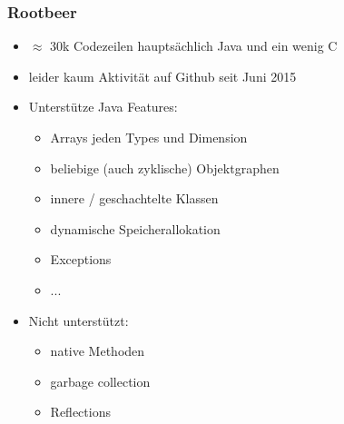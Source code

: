 \begin{frame}
    \frametitle{Rootbeer}
    \begin{itemize}
        \item $\approx$ 30k Codezeilen hauptsächlich Java und ein wenig C %
        \item leider kaum Aktivität auf Github seit Juni 2015 %
        \item Unterstütze Java Features:
        \begin{itemize}
            \item Arrays jeden Types und Dimension
            \item beliebige (auch zyklische) Objektgraphen
            \item innere / geschachtelte Klassen
            \item dynamische Speicherallokation
            \item Exceptions
            \item ...
        \end{itemize}
        \item Nicht unterstützt:
        \begin{itemize}
            \item native Methoden %
            \item garbage collection
            \item Reflections
        \end{itemize}
    \end{itemize}
\end{frame}


